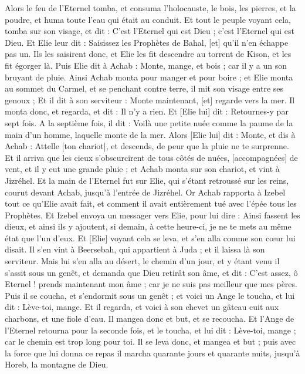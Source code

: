 \begin{multicols}{2}
Alors le feu de l'Eternel tomba, et consuma l'holocauste, le bois, les pierres, et la poudre, et huma toute l'eau qui était au conduit.
Et tout le peuple voyant cela, tomba sur son visage, et dit : C'est l'Eternel qui est Dieu ; c'est l'Eternel qui est Dieu.
Et Elie leur dit : Saisissez les Prophètes de Bahal, [et] qu'il n'en échappe pas un. Ils les saisirent donc, et Elie les fit descendre au torrent de Kison, et les fit égorger là.
Puis Elie dit à Achab : Monte, mange, et bois ; car il y a un son bruyant de pluie.
Ainsi Achab monta pour manger et pour boire ; et Elie monta au sommet du Carmel, et se penchant contre terre, il mit son visage entre ses genoux ;
Et il dit à son serviteur : Monte maintenant, [et] regarde vers la mer. Il monta donc, et regarda, et dit : Il n'y a rien. Et [Elie lui] dit : Retournes-y par sept fois.
A la septième fois, il dit : Voilà une petite nuée comme la paume de la main d'un homme, laquelle monte de la mer. Alors [Elie lui] dit : Monte, et dis à Achab : Attelle [ton chariot], et descends, de peur que la pluie ne te surprenne.
Et il arriva que les cieux s'obscurcirent de tous côtés de nuées, [accompagnées] de vent, et il y eut une grande pluie ; et Achab monta sur son chariot, et vint à Jizréhel.
Et la main de l'Eternel fut sur Elie, qui s'étant retroussé sur les reins, courut devant Achab, jusqu'à l'entrée de Jizréhel.
\VerseOne{}Or Achab rapporta à Izebel tout ce qu'Elie avait fait, et comment il avait entièrement tué avec l'épée tous les Prophètes.
Et Izebel envoya un messager vers Elie, pour lui dire : Ainsi fassent les dieux, et ainsi ils y ajoutent, si demain, à cette heure-ci, je ne te mets au même état que l'un d'eux.
Et [Elie] voyant cela se leva, et s'en alla comme son cœur lui disait. Il s'en vint à Beersebah, qui appartient à Juda ; et il laissa là son serviteur.
Mais lui s'en alla au désert, le chemin d'un jour, et y étant venu il s'assit sous un genêt, et demanda que Dieu retirât son âme, et dit : C'est assez, ô Eternel ! prends maintenant mon âme ; car je ne suis pas meilleur que mes pères.
Puis il se coucha, et s'endormit sous un genêt ; et voici un Ange le toucha, et lui dit : Lève-toi, mange.
Et il regarda, et voici à son chevet un gâteau cuit aux charbons, et une fiole d'eau. Il mangea donc et but, et se recoucha.
Et l'Ange de l'Eternel retourna pour la seconde fois, et le toucha, et lui dit : Lève-toi, mange ; car le chemin est trop long pour toi.
Il se leva donc, et mangea et but ; puis avec la force que lui donna ce repas il marcha quarante jours et quarante nuits, jusqu'à Horeb, la montagne de Dieu.

\end{multicols}
